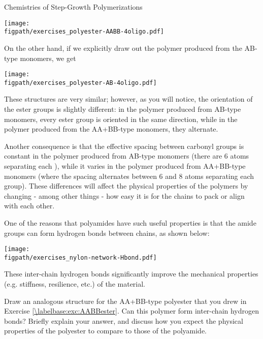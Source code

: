 \begin{activity}{Chemistries of Step-Growth Polymerizations}
\begin{exercises}
\begin{enumerate}
\begin{solution}
{						\centerline{\texttt{[image: \\figpath/exercises\_polyester-AABB-4oligo.pdf]}}
						
						On the other hand, if we explicitly draw out the polymer produced from the AB-type monomers, we get
						
						\centerline{\texttt{[image: \\figpath/exercises\_polyester-AB-4oligo.pdf]}}
						
						These structures are very similar; however, as you will notice, the orientation of the ester groups is slightly different: in the polymer produced from AB-type monomers, every ester group is oriented in the same direction, while in the polymer produced from the AA+BB-type monomers, they alternate.
						
						Another consequence is that the effective spacing between carbonyl groups is constant in the polymer produced from AB-type monomers (there are 6 atoms separating each ), while it varies in the polymer produced from AA+BB-type monomers (where the spacing alternates between 6 and 8 atoms separating each  group).
						These differences will affect the physical properties of the polymers by changing - among other things - how easy it is for the chains to pack or align with each other.
						
					}\end{solution}
					
			\end{enumerate}
		
		\exercise One of the reasons that polyamides have such useful properties is that the amide groups can form hydrogen bonds between chains, as shown below:
			
			\centerline{\texttt{[image: \\figpath/exercises\_nylon-network-Hbond.pdf]}}	
		
			These inter-chain hydrogen bonds significantly improve the mechanical properties (e.g. stiffness, resilience, etc.) of the material.
			
			Draw an analogous structure for the AA+BB-type polyester that you drew in Exercise \ref{\labelbase:exc:AABBester}.  Can this polymer form inter-chain hydrogen bonds?  Briefly explain your answer, and discuss how you expect the physical properties of the polyester to compare to those of the polyamide.
			
			\begin{solution}
\end{solution}
\end{exercises}
\end{activity}

